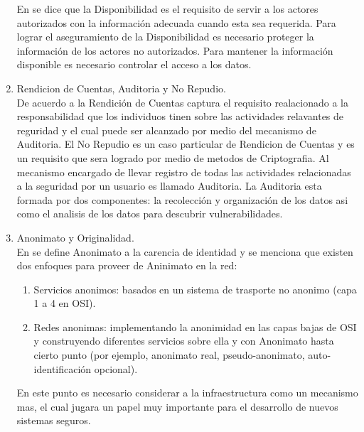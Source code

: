 \documentclass[runningheads,a4paper]{llncs}
\begin{document}
\begin{enumerate}
En \cite{CoSMoIntroduction} se dice que la Disponibilidad es el requisito de servir a los actores autorizados  con la información adecuada cuando esta sea requerida. Para lograr el aseguramiento de la Disponibilidad es necesario proteger la información de los actores no autorizados. Para mantener la información disponible es necesario controlar el acceso a los datos.\\  
	
	\item Rendicion de Cuentas, Auditoria y No Repudio.\\

De acuerdo a \cite{CoSMoIntroduction} la Rendición de Cuentas captura el requisito realacionado a la responsabilidad que los individuos tinen sobre las actividades relavantes de reguridad y el cual puede ser alcanzado por medio del mecanismo de Auditoria. El No Repudio es un caso particular de Rendicion de Cuentas  y es un requisito que sera logrado por medio de metodos de \gls{Criptografia}. Al mecanismo encargado de llevar registro de todas las actividades relacionadas a la seguridad por un usuario es llamado Auditoria. La Auditoria esta formada por dos componentes: la recolección y organización de los datos asi como el analisis de los datos para descubrir vulnerabilidades.\\

	\item Anonimato y Originalidad.\\
	
En \cite{CoSMoIntroduction} se define Anonimato a la carencia de identidad y se menciona que existen dos enfoques para proveer de Aninimato en la red:\\

	\begin{enumerate}
		\item Servicios anonimos: basados en un sistema de trasporte no anonimo (capa 1 a 4 en \gls{OSI}).
		\item Redes anonimas: implementando la anonimidad en las capas bajas de \gls{OSI} y construyendo diferentes servicios sobre ella y con Anonimato hasta cierto punto (por ejemplo, anonimato real, pseudo-anonimato, auto-identificación opcional).\\
	\end{enumerate}

En este punto es necesario considerar a la infraestructura como un mecanismo mas, el cual jugara un papel muy importante para el desarrollo de nuevos sistemas seguros.\\


\end{enumerate}
\end{document}
